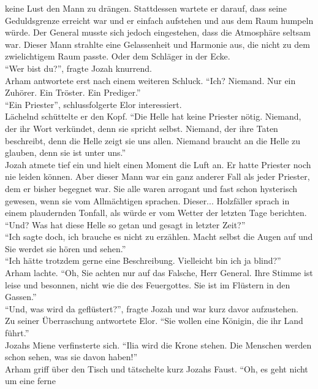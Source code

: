 keine Lust den Mann zu drängen. Stattdessen wartete er darauf, dass seine Geduldsgrenze erreicht 
war und er einfach aufstehen und aus dem Raum humpeln würde. Der General musste sich jedoch 
eingestehen, dass die Atmosphäre seltsam war. Dieser Mann strahlte eine Gelassenheit und Harmonie 
aus, die nicht zu dem zwielichtigem Raum passte. Oder dem Schläger in der Ecke.\\
``Wer bist du?'', fragte Jozah knurrend.\\
Arham antwortete erst nach einem weiteren Schluck. ``Ich? Niemand. Nur ein Zuhörer. Ein Tröster. 
Ein Prediger.''\\
``Ein Priester'', schlussfolgerte Elor interessiert.\\
Lächelnd schüttelte er den Kopf. ``Die Helle hat keine Priester nötig. Niemand, der ihr Wort 
verkündet, denn sie spricht selbst. Niemand, der ihre Taten beschreibt, denn die Helle zeigt sie 
uns allen. Niemand braucht an die Helle zu glauben, denn sie ist unter uns.''\\
Jozah atmete tief ein und hielt einen Moment die Luft an. Er hatte Priester noch nie leiden können. 
Aber dieser Mann war ein ganz anderer Fall als jeder Priester, dem er bisher begegnet war. Sie alle 
waren arrogant und fast schon hysterisch gewesen, wenn sie vom Allmächtigen sprachen. Dieser... 
Holzfäller sprach in einem plaudernden Tonfall, als würde er vom Wetter der letzten Tage 
berichten.\\
``Und? Was hat diese Helle so getan und gesagt in letzter Zeit?''\\
``Ich sagte doch, ich brauche es nicht zu erzählen. Macht selbst die Augen auf und Sie werdet sie 
hören und sehen.''\\
``Ich hätte trotzdem gerne eine Beschreibung. Vielleicht bin ich ja blind?''\\
Arham lachte. ``Oh, Sie achten nur auf das Falsche, Herr General. Ihre Stimme ist leise und 
besonnen, nicht wie die des Feuergottes. Sie ist im Flüstern in den Gassen.''\\
``Und, was wird da geflüstert?'', fragte Jozah und war kurz davor aufzustehen.\\
Zu seiner Überraschung antwortete Elor. ``Sie wollen eine Königin, die ihr Land führt.''\\
Jozahs Miene verfinsterte sich. ``Ilia wird die Krone stehen. Die Menschen werden schon sehen, was 
sie davon haben!''\\
Arham griff über den Tisch und tätschelte kurz Jozahs Faust. ``Oh, es geht nicht um eine ferne 
